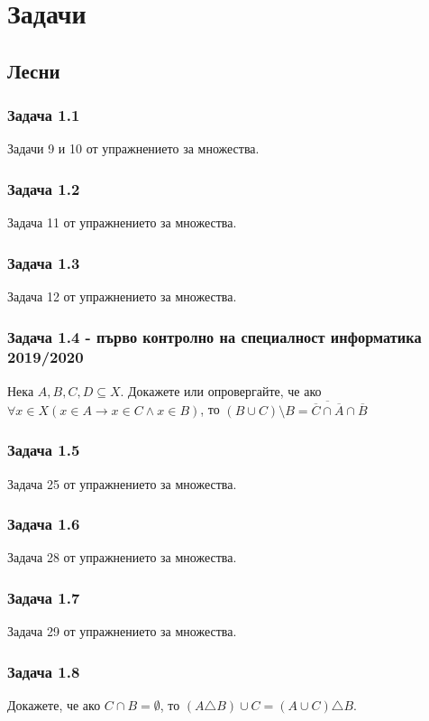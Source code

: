 \documentclass[12pt]{article}
\begin{document}
\section*{Задачи}

\subsection*{Лесни}
\subsubsection*{Задача 1.1}
Задачи 9 и 10 от упражнението за множества.

\subsubsection*{Задача 1.2}
Задача 11 от упражнението за множества.

\subsubsection*{Задача 1.3}
Задача 12 от упражнението за множества.

\subsubsection*{Задача 1.4 - първо контролно на специалност информатика 2019/2020}
Нека $A, B, C, D \subseteq X$. Докажете или опровергайте, че ако $\forall x \in X (x \in A \rightarrow x \in C \land x \in B)$, то $(B \cup C) \setminus B = \overline{\overline{C} \cap \overline{A}} \cap \overline{B}$

\subsubsection*{Задача 1.5}
Задача 25 от упражнението за множества.

\subsubsection*{Задача 1.6}
Задача 28 от упражнението за множества.

\subsubsection*{Задача 1.7}
Задача 29 от упражнението за множества.

\subsubsection*{Задача 1.8}
Докажете, че ако $C \cap B = \emptyset$, то $(A \triangle B) \cup C = (A \cup C) \triangle B$.
\end{document}
